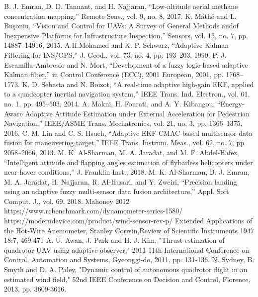 \documentclass[conference]{IEEEtran}
\begin{document}
\begin{thebibliography}{00}
B. J. Emran, D. D. Tannant, and H. Najjaran, “Low-altitude aerial methane concentration mapping,” Remote Sens., vol. 9, no. 8, 2017.
 K. Máthé and L. Buşoniu, “Vision and Control for UAVs: A Survey of General Methods andof Inexpensive Platforms for Infrastructure Inspection,” Sensors, vol. 15, no. 7, pp. 14887–14916, 2015.
 A.H.Mohamed and K. P. Schwarz, “Adaptive Kalman Filtering for INS/GPS,” J. Geod., vol. 73, no. 4, pp. 193–203, 1999.
 P. J. Escamilla-Ambrosio and N. Mort, “Development of a fuzzy logic-based adaptive Kalman filter,” in Control Conference (ECC), 2001 European, 2001, pp. 1768–1773.
 K. D. Sebesta and N. Boizot, “A real-time adaptive high-gain EKF, applied to a quadcopter inertial navigation system,” IEEE Trans. Ind. Electron., vol. 61, no. 1, pp. 495–503, 2014.
 A. Makni, H. Fourati, and A. Y. Kibangou, “Energy-Aware Adaptive Attitude Estimation under External Acceleration for Pedestrian Navigation,” IEEE/ASME Trans. Mechatronics, vol. 21, no. 3, pp. 1366–1375, 2016.
 C. M. Lin and C. S. Hsueh, “Adaptive EKF-CMAC-based multisensor data fusion for maneuvering target,” IEEE Trans. Instrum. Meas., vol. 62, no. 7, pp. 2058–2066, 2013.
 M. K. Al-Sharman, M. A. Jaradat, and M. F. Abdel-Hafez, “Intelligent attitude and flapping angles estimation of flybarless helicopters under near-hover conditions,” J. Franklin Inst., 2018.
 M. K. Al-Sharman, B. J. Emran, M. A. Jaradat, H. Najjaran, R. Al-Husari, and Y. Zweiri, “Precision landing using an adaptive fuzzy multi-sensor data fusion architecture,” Appl. Soft Comput. J., vol. 69, 2018.
		 Mahoney 2012
 https://www.rcbenchmark.com/dynamometer-series-1580/
 https://moderndevice.com/product/wind-sensor-rev-p/
 Extended Applications of the Hot‐Wire Anemometer, Stanley Corrsin,Review of Scientific Instruments 1947 18:7, 469-471 
 A. U. Awan, J. Park and H. J. Kim, "Thrust estimation of quadrotor UAV using adaptive observer," 2011 11th International Conference on Control, Automation and Systems, Gyeonggi-do, 2011, pp. 131-136.
 N. Sydney, B. Smyth and D. A. Paley, "Dynamic control of autonomous quadrotor flight in an estimated wind field," 52nd IEEE Conference on Decision and Control, Florence, 2013, pp. 3609-3616.
\end{thebibliography}
\end{document}
